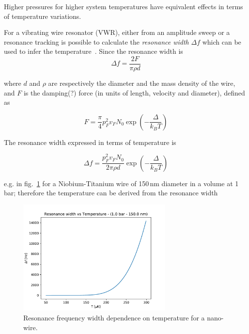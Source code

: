 \documentclass[a4paper,12pt]{article}
\begin{document}
Higher pressures for higher system temperatures have equivalent effects in terms of temperature variations.

For a vibrating wire resonator (VWR), either from an amplitude sweep or a resonance tracking is possible to calculate the \textit{resonance width} $\Delta f$ which can be used to infer the temperature~\cite{lawson}.
Since the resonance width is
\begin{equation}
\Delta f = \frac{2F}{\pi \rho d}
\end{equation}

where $d$ and $\rho$ are respectively the diameter and the mass density of the wire, and $F$ is the damping(?) force (in units of length, velocity and diameter), defined as

\begin{equation}
F = \frac{\pi}{4}p^2_F v_F N_0 \exp{\left( -\frac{\Delta}{k_B T} \right)}
\end{equation}

The resonance width expressed in terms of temperature is

\begin{equation}
\Delta f = \frac{p^2_F v_F N_0}{2\pi\rho d}\exp{\left( -\frac{\Delta}{k_B T} \right)}
\end{equation}

e.g. in fig.~\ref{fig:WvsT} for a Niobium-Titanium wire of 150\,nm diameter in a volume at 1\,bar; therefore the temperature can be derived from the resonance width

\begin{figure}[!ht]
  \begin{center}
    \includegraphics[width=0.69\textwidth]{W_vs_T}
    \caption{Resonance frequency width dependence on temperature for a nano-wire.}
    \label{fig:WvsT}
  \end{center}
\end{figure}
\end{document}
